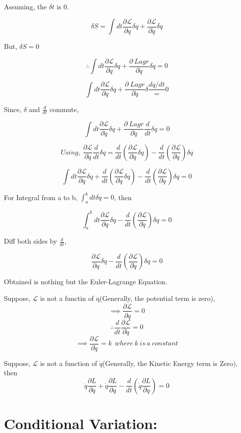 \documentclass[a4paper]{article}
\newcommand{\Lagr}{\mathcal{L}}
\newcommand{\ddt}{\frac{d}{dt}}
\newcommand{\pdt}[2]{\frac{\partial #1}{\partial #2}}
\begin{document}
		Assuming, the $\delta t$ is $0$.

		$$ \delta S = \int dt \frac{\partial\Lagr}{\partial q}\delta q + \frac{\partial\Lagr}{\partial\dot{q}}\delta \dot{q} $$

		But, $\delta S = 0$

		$$ \therefore \int dt \frac{\partial\Lagr}{\partial q}\delta q + \frac{\partial\ Lagr}{\partial\dot{q}}\delta \dot{q} = 0 $$

		$$ \int dt \frac{\partial\Lagr}{\partial q}\delta q + \frac{\partial\ Lagr}{\partial\dot{q}}\delta \frac{dq/dt} = 0 $$
		
		Since, $\delta$ and $\frac{d}{dt}$ commute,

		$$ \int dt \frac{\partial\Lagr}{\partial q}\delta q + \frac{\partial\ Lagr}{\partial\dot{q}}\ddt\delta q = 0 $$

		$$Using,\ \frac{\partial\Lagr}{\partial \dot{q}}\frac{d}{dt}\delta q = \ddt(\frac{\partial\Lagr}{\partial\dot{q}}\delta q) - \ddt(\frac{\partial\Lagr}{\partial\dot{q}}) \delta q $$

		$$ \int dt \frac{\partial\Lagr}{\partial q}\delta q + \ddt(\frac{\partial\Lagr}{\partial\dot{q}}\delta q) - \ddt(\frac{\partial\Lagr}{\partial\dot{q}}) \delta q = 0 $$

		For Integral from a to b, $\int_a^b dt \delta q = 0$, then

		$$ \int_a^b dt \frac{\partial\Lagr}{\partial q}\delta q - \ddt(\frac{\partial\Lagr}{\partial\dot{q}}) \delta q = 0 $$
		
		Diff both sides by $\ddt$,

		\begin{equation}
			\frac{\partial\Lagr}{\partial q}\delta q - \ddt(\frac{\partial\Lagr}{\partial\dot{q}}) \delta q = 0 \label{eq_E-L}
		\end{equation}

		Obtained is nothing but the Euler-Lagrange Equation.
		
		Suppose, $\Lagr$ is not a functin of q(Generally, the potential term is zero), 
		$$\implies \frac{\partial\Lagr}{\partial q} = 0 $$
		$$\therefore \ddt\frac{\partial\Lagr}{\partial \dot{q}} = 0 $$
		$$\implies \frac{\partial\Lagr}{\partial \dot{q}} = k\ \ where\ k\ is\ a\ constant$$ 

		Suppose, $\Lagr$ is not a function of $\dot{q}$(Generally, the Kinetic Energy term is Zero), then
		$$ \ddot{q}\pdt{L}{\dot{q}} + \dot{q}\pdt{L}{q} - \ddt(\dot{q}\pdt{L}{\dot{q}}) = 0$$

	\section*{Conditional Variation: }
		
\end{document}

